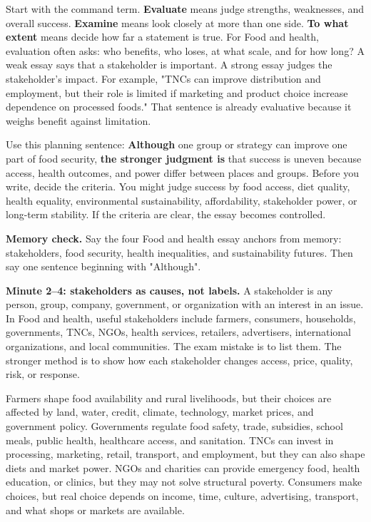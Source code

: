 \documentclass[11pt,a4paper]{article}
\newcommand{\term}[1]{\textcolor{HeadingBlue}{\textbf{#1}}}
\newcommand{\exam}[1]{\textcolor{AccentTeal}{\textbf{#1}}}
\begin{document}
Start with the command term. \exam{Evaluate} means judge strengths,
weaknesses, and overall success. \exam{Examine} means look closely at more than
one side. \exam{To what extent} means decide how far a statement is true.
For Food and health, evaluation often asks: who benefits, who loses, at what
scale, and for how long? A weak essay says that a stakeholder is important. A
strong essay judges the stakeholder's impact. For example, "TNCs can improve
distribution and employment, but their role is limited if marketing and product
choice increase dependence on processed foods." That sentence is already
evaluative because it weighs benefit against limitation.

Use this planning sentence: \term{Although} one group or strategy can improve
one part of food security, \term{the stronger judgment is} that success is
uneven because access, health outcomes, and power differ between places and
groups. Before you write, decide the criteria. You might judge success by food
access, diet quality, health equality, environmental sustainability,
affordability, stakeholder power, or long-term stability. If the criteria are
clear, the essay becomes controlled.

\textbf{Memory check.} Say the four Food and health essay anchors from memory:
stakeholders, food security, health inequalities, and sustainability futures.
Then say one sentence beginning with "Although".

\textbf{Minute 2--4: stakeholders as causes, not labels.}
A stakeholder is any person, group, company, government, or organization with an
interest in an issue. In Food and health, useful stakeholders include farmers,
consumers, households, governments, TNCs, NGOs, health services, retailers,
advertisers, international organizations, and local communities. The exam
mistake is to list them. The stronger method is to show how each stakeholder
changes access, price, quality, risk, or response.

Farmers shape food availability and rural livelihoods, but their choices are
affected by land, water, credit, climate, technology, market prices, and
government policy. Governments regulate food safety, trade, subsidies, school
meals, public health, healthcare access, and sanitation. TNCs can invest in
processing, marketing, retail, transport, and employment, but they can also
shape diets and market power. NGOs and charities can provide emergency food,
health education, or clinics, but they may not solve structural poverty.
Consumers make choices, but real choice depends on income, time, culture,
advertising, transport, and what shops or markets are available.
\end{document}
